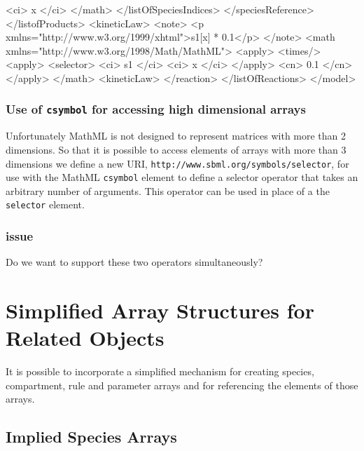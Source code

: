 \documentclass{cekarticle}
\begin{document}
\begin{example}
                            <ci> x </ci>
                        </math>
                    </listOfSpeciesIndices>
                </speciesReference>
             </listofProducts>
            <kineticLaw>
                <note>
                    <p xmlns="http://www.w3.org/1999/xhtml">s1[x] * 0.1</p>
                </note>
                <math xmlns="http://www.w3.org/1998/Math/MathML">
                    <apply>
                        <times/>
                        <apply>
                            <selector>
                            <ci> s1 </ci>
                            <ci> x </ci>
                        </apply>
                        <cn> 0.1 </cn>
                    </apply>
                </math>
            <kineticLaw>
        </reaction>
    </listOfReactions>
</model>
\end{example}

\subsubsection{Use of \texttt{csymbol} for accessing high dimensional arrays}

Unfortunately MathML is not designed to represent matrices with more than 2 dimensions.
So that it is possible to access elements of arrays with more than 3 dimensions we
define a new URI, \texttt{http://www.sbml.org/symbols/selector}, for use with the MathML \texttt{csymbol} element
to define a selector operator that takes an arbitrary number of arguments.
This operator can be used in place of a the \texttt{selector} element.

\subsubsection{issue}

Do we want to support these two operators simultaneously? 

\section{Simplified Array Structures for Related Objects}

It is possible to incorporate a simplified mechanism for creating
species, compartment, rule and parameter arrays and for referencing the
elements of those arrays.

\subsection{Implied Species Arrays}
\label{sec:impliedarrays}
\end{document}
